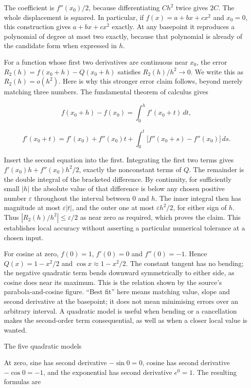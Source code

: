 \documentclass[
  11pt,
]{article}
\begin{document}
The coefficient is \(f''(x_0)/2\), because differentiating \(Ch^2\)
twice gives \(2C\). The whole displacement is squared. In particular, if
\(f(x)=a+bx+cx^2\) and \(x_0=0\), this construction gives \(a+bx+cx^2\)
exactly. At any basepoint it reproduces a polynomial of degree at most
two exactly, because that polynomial is already of the candidate form
when expressed in \(h\).

For a function whose first two derivatives are continuous near \(x_0\),
the error \(R_2(h)=f(x_0+h)-Q(x_0+h)\) satisfies \(R_2(h)/h^2\to0\). We
write this as \(R_2(h)=o(h^2)\). Here is why this stronger error claim
follows, beyond merely matching three numbers. The fundamental theorem
of calculus gives

\[f(x_0+h)-f(x_0)=\int_0^h f'(x_0+t)\,dt,\]

\[f'(x_0+t)=f'(x_0)+f''(x_0)t+\int_0^t\bigl[f''(x_0+s)-f''(x_0)\bigr]\,ds.\]

Insert the second equation into the first. Integrating the first two
terms gives \(f'(x_0)h+f''(x_0)h^2/2\), exactly the nonconstant terms of
\(Q\). The remainder is the double integral of the bracketed difference.
By continuity, for sufficiently small \(|h|\) the absolute value of that
difference is below any chosen positive number \(\varepsilon\)
throughout the interval between \(0\) and \(h\). The inner integral then
has magnitude at most \(\varepsilon|t|\), and the outer one at most
\(\varepsilon h^2/2\), for either sign of \(h\). Thus
\(|R_2(h)/h^2|\le\varepsilon/2\) as near zero as required, which proves
the claim. This establishes local accuracy without asserting a
particular numerical tolerance at a chosen input.

For cosine at zero, \(f(0)=1\), \(f'(0)=0\) and \(f''(0)=-1\). Hence
\(Q(x)=1-x^2/2\) and \(\cos x\approx1-x^2/2\). The constant tangent has
no bending; the negative quadratic term bends downward symmetrically to
either side, as cosine does near its maximum. This is the relation shown
by the source's parabola-and-cosine figure. ``Best fit'' here means
matching value, slope and second derivative at the basepoint; it does
not mean minimising errors over an arbitrary interval. A quadratic model
is useful when bending or a cancellation makes the second-order term
consequential, as well as when a closer local value is wanted.

The five quadratic models

At zero, sine has second derivative \(-\sin0=0\), cosine has second
derivative \(-\cos0=-1\), and the exponential has second derivative
\(e^0=1\). The resulting formulas are
\end{document}
